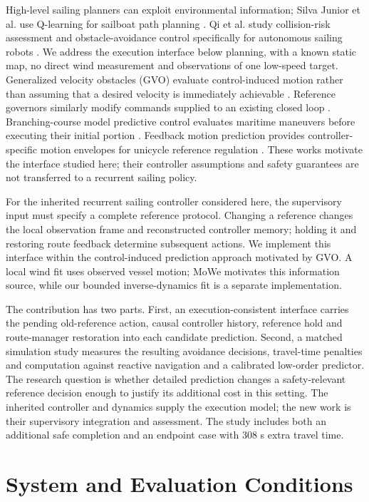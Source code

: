 \documentclass[conference]{IEEEtran}
\begin{document}
High-level sailing planners can exploit environmental information; Silva Junior et al. use Q-learning for sailboat path planning \cite{ref1}. Qi et al. study collision-risk assessment and obstacle-avoidance control specifically for autonomous sailing robots \cite{ref2}. We address the execution interface below planning, with a known static map, no direct wind measurement and observations of one low-speed target. Generalized velocity obstacles (GVO) evaluate control-induced motion rather than assuming that a desired velocity is immediately achievable \cite{ref3}. Reference governors similarly modify commands supplied to an existing closed loop \cite{ref4}. Branching-course model predictive control evaluates maritime maneuvers before executing their initial portion \cite{ref5}. Feedback motion prediction provides controller-specific motion envelopes for unicycle reference regulation \cite{ref6}. These works motivate the interface studied here; their controller assumptions and safety guarantees are not transferred to a recurrent sailing policy.

For the inherited recurrent sailing controller considered here, the supervisory input must specify a complete reference protocol. Changing a reference changes the local observation frame and reconstructed controller memory; holding it and restoring route feedback determine subsequent actions. We implement this interface within the control-induced prediction approach motivated by GVO. A local wind fit uses observed vessel motion; MoWe \cite{ref7} motivates this information source, while our bounded inverse-dynamics fit is a separate implementation.

The contribution has two parts. First, an execution-consistent interface carries the pending old-reference action, causal controller history, reference hold and route-manager restoration into each candidate prediction. Second, a matched simulation study measures the resulting avoidance decisions, travel-time penalties and computation against reactive navigation and a calibrated low-order predictor. The research question is whether detailed prediction changes a safety-relevant reference decision enough to justify its additional cost in this setting. The inherited controller and dynamics supply the execution model; the new work is their supervisory integration and assessment. The study includes both an additional safe completion and an endpoint case with 308 s extra travel time.

\section{System and Evaluation Conditions}
\end{document}
